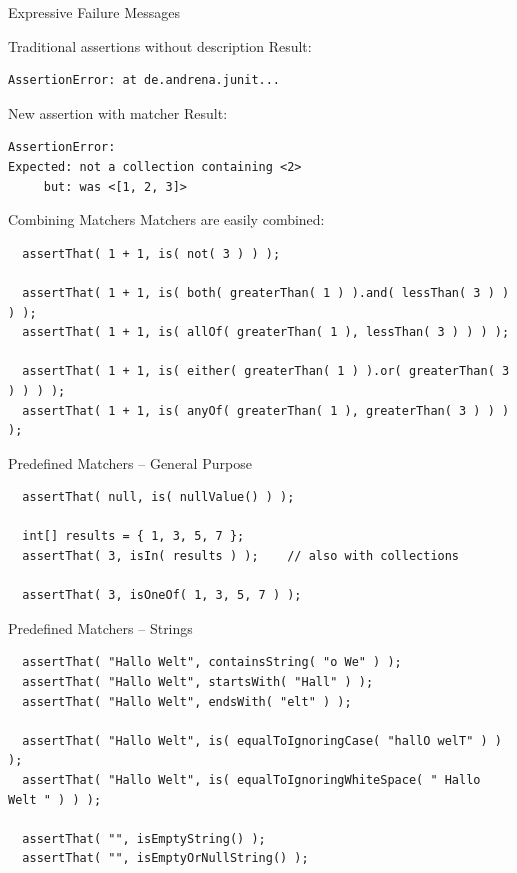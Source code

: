 \begin{frame}[fragile]{Expressive Failure Messages}
    \begin{block}{Traditional assertions without description}
Result:
\begin{lstlisting}
AssertionError: at de.andrena.junit...
\end{lstlisting}
    \end{block}	
\pause
    \begin{block}{New assertion with matcher}
Result:
\begin{lstlisting}
AssertionError:
Expected: not a collection containing <2>
     but: was <[1, 2, 3]>
\end{lstlisting}
    \end{block}
\end{frame}


\begin{frame}[fragile]{Combining Matchers}
	Matchers are easily combined:

\begin{lstlisting}
  assertThat( 1 + 1, is( not( 3 ) ) );

  assertThat( 1 + 1, is( both( greaterThan( 1 ) ).and( lessThan( 3 ) ) ) );
  assertThat( 1 + 1, is( allOf( greaterThan( 1 ), lessThan( 3 ) ) ) );

  assertThat( 1 + 1, is( either( greaterThan( 1 ) ).or( greaterThan( 3 ) ) ) );
  assertThat( 1 + 1, is( anyOf( greaterThan( 1 ), greaterThan( 3 ) ) ) );
\end{lstlisting}

\end{frame}

\begin{frame}[fragile]{Predefined Matchers -- General Purpose}
\begin{lstlisting}
  assertThat( null, is( nullValue() ) );

  int[] results = { 1, 3, 5, 7 };
  assertThat( 3, isIn( results ) );    // also with collections

  assertThat( 3, isOneOf( 1, 3, 5, 7 ) );
\end{lstlisting}
\end{frame}


\begin{frame}[fragile]{Predefined Matchers -- Strings}
\begin{lstlisting}
  assertThat( "Hallo Welt", containsString( "o We" ) );
  assertThat( "Hallo Welt", startsWith( "Hall" ) );
  assertThat( "Hallo Welt", endsWith( "elt" ) );
        
  assertThat( "Hallo Welt", is( equalToIgnoringCase( "hallO welT" ) ) );
  assertThat( "Hallo Welt", is( equalToIgnoringWhiteSpace( " Hallo    Welt " ) ) );

  assertThat( "", isEmptyString() );
  assertThat( "", isEmptyOrNullString() );
\end{lstlisting}
\end{frame}


